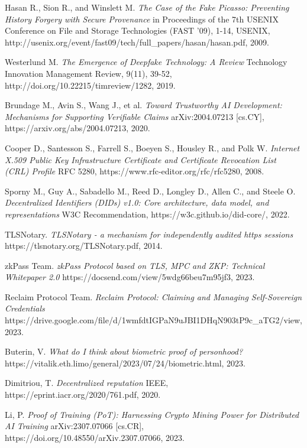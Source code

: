 \documentclass[conference]{IEEEtran}
\begin{document}
\begin{thebibliography}{}
Hasan R., Sion R., and Winslett M. \emph{The Case of the Fake Picasso: Preventing History Forgery with Secure Provenance} in Proceedings of the 7th USENIX Conference on File and Storage Technologies (FAST '09), 1-14, USENIX, http://usenix.org/event/fast09/tech/full\_papers/hasan/hasan.pdf, 2009.

Westerlund M. \emph{The Emergence of Deepfake Technology: A Review} Technology Innovation Management Review, 9(11), 39-52, http://doi.org/10.22215/timreview/1282, 2019.

Brundage M., Avin S., Wang J., et al. \emph{Toward Trustworthy AI Development: Mechanisms for Supporting Verifiable Claims} arXiv:2004.07213 [cs.CY], https://arxiv.org/abs/2004.07213, 2020.

Cooper D., Santesson S., Farrell S., Boeyen S., Housley R., and Polk W. \emph{Internet X.509 Public Key Infrastructure Certificate and Certificate Revocation List (CRL) Profile} RFC 5280, https://www.rfc-editor.org/rfc/rfc5280, 2008.

Sporny M., Guy A., Sabadello M., Reed D., Longley D., Allen C., and Steele O. \emph{Decentralized Identifiers (DIDs) v1.0: Core architecture, data model, and representations} W3C Recommendation, https://w3c.github.io/did-core/, 2022.

TLSNotary. \emph{TLSNotary - a mechanism for independently audited https sessions} https://tlsnotary.org/TLSNotary.pdf, 2014.

zkPass Team. \emph{zkPass Protocol based on TLS, MPC and ZKP: Technical Whitepaper 2.0} https://docsend.com/view/5wdg66beu7m95jf3, 2023.

Reclaim Protocol Team. \emph{Reclaim Protocol: Claiming and Managing Self-Sovereign Credentials} https://drive.google.com/file/d/1wmfdtIGPaN9uJBI1DHqN903tP9c\_aTG2/view, 2023.

Buterin, V. \emph{What do I think about biometric proof of personhood?} https://vitalik.eth.limo/general/2023/07/24/biometric.html, 2023.

Dimitriou, T. \emph{Decentralized reputation} IEEE, https://eprint.iacr.org/2020/761.pdf, 2020.

Li, P. \emph{Proof of Training (PoT): Harnessing Crypto Mining Power for Distributed AI Training} arXiv:2307.07066 [cs.CR], 
https://doi.org/10.48550/arXiv.2307.07066, 2023.


\end{thebibliography}
\end{document}
